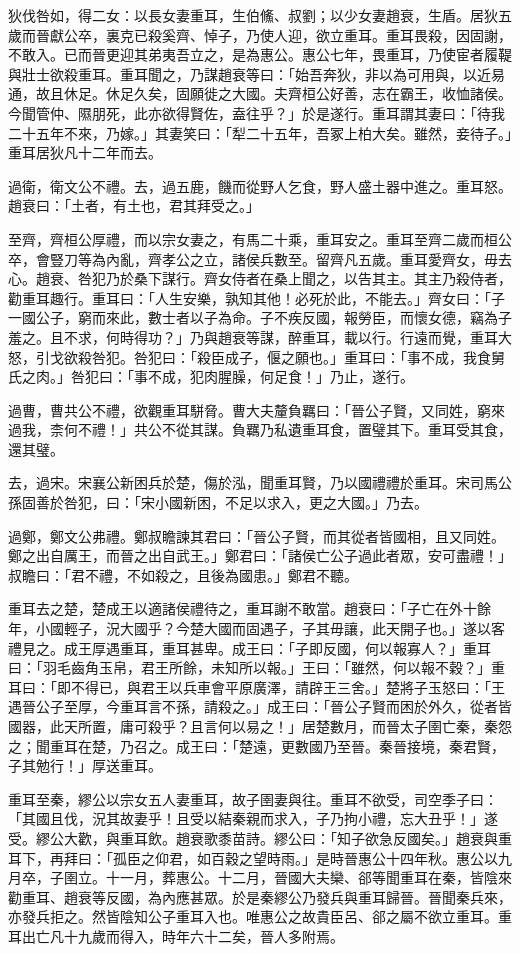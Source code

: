 \begin{pinyinscope}
狄伐咎如，得二女：以長女妻重耳，生伯鯈、叔劉；以少女妻趙衰，生盾。居狄五歲而晉獻公卒，裏克已殺奚齊、悼子，乃使人迎，欲立重耳。重耳畏殺，因固謝，不敢入。已而晉更迎其弟夷吾立之，是為惠公。惠公七年，畏重耳，乃使宦者履鞮與壯士欲殺重耳。重耳聞之，乃謀趙衰等曰：「始吾奔狄，非以為可用與，以近易通，故且休足。休足久矣，固願徙之大國。夫齊桓公好善，志在霸王，收恤諸侯。今聞管仲、隰朋死，此亦欲得賢佐，盍往乎？」於是遂行。重耳謂其妻曰：「待我二十五年不來，乃嫁。」其妻笑曰：「犁二十五年，吾冢上柏大矣。雖然，妾待子。」重耳居狄凡十二年而去。

過衛，衛文公不禮。去，過五鹿，饑而從野人乞食，野人盛土器中進之。重耳怒。趙衰曰：「土者，有土也，君其拜受之。」

至齊，齊桓公厚禮，而以宗女妻之，有馬二十乘，重耳安之。重耳至齊二歲而桓公卒，會豎刀等為內亂，齊孝公之立，諸侯兵數至。留齊凡五歲。重耳愛齊女，毋去心。趙衰、咎犯乃於桑下謀行。齊女侍者在桑上聞之，以告其主。其主乃殺侍者，勸重耳趣行。重耳曰：「人生安樂，孰知其他！必死於此，不能去。」齊女曰：「子一國公子，窮而來此，數士者以子為命。子不疾反國，報勞臣，而懷女德，竊為子羞之。且不求，何時得功？」乃與趙衰等謀，醉重耳，載以行。行遠而覺，重耳大怒，引戈欲殺咎犯。咎犯曰：「殺臣成子，偃之願也。」重耳曰：「事不成，我食舅氏之肉。」咎犯曰：「事不成，犯肉腥臊，何足食！」乃止，遂行。

過曹，曹共公不禮，欲觀重耳駢脅。曹大夫釐負羈曰：「晉公子賢，又同姓，窮來過我，柰何不禮！」共公不從其謀。負羈乃私遺重耳食，置璧其下。重耳受其食，還其璧。

去，過宋。宋襄公新困兵於楚，傷於泓，聞重耳賢，乃以國禮禮於重耳。宋司馬公孫固善於咎犯，曰：「宋小國新困，不足以求入，更之大國。」乃去。

過鄭，鄭文公弗禮。鄭叔瞻諫其君曰：「晉公子賢，而其從者皆國相，且又同姓。鄭之出自厲王，而晉之出自武王。」鄭君曰：「諸侯亡公子過此者眾，安可盡禮！」叔瞻曰：「君不禮，不如殺之，且後為國患。」鄭君不聽。

重耳去之楚，楚成王以適諸侯禮待之，重耳謝不敢當。趙衰曰：「子亡在外十餘年，小國輕子，況大國乎？今楚大國而固遇子，子其毋讓，此天開子也。」遂以客禮見之。成王厚遇重耳，重耳甚卑。成王曰：「子即反國，何以報寡人？」重耳曰：「羽毛齒角玉帛，君王所餘，未知所以報。」王曰：「雖然，何以報不穀？」重耳曰：「即不得已，與君王以兵車會平原廣澤，請辟王三舍。」楚將子玉怒曰：「王遇晉公子至厚，今重耳言不孫，請殺之。」成王曰：「晉公子賢而困於外久，從者皆國器，此天所置，庸可殺乎？且言何以易之！」居楚數月，而晉太子圉亡秦，秦怨之；聞重耳在楚，乃召之。成王曰：「楚遠，更數國乃至晉。秦晉接境，秦君賢，子其勉行！」厚送重耳。

重耳至秦，繆公以宗女五人妻重耳，故子圉妻與往。重耳不欲受，司空季子曰：「其國且伐，況其故妻乎！且受以結秦親而求入，子乃拘小禮，忘大丑乎！」遂受。繆公大歡，與重耳飲。趙衰歌黍苗詩。繆公曰：「知子欲急反國矣。」趙衰與重耳下，再拜曰：「孤臣之仰君，如百穀之望時雨。」是時晉惠公十四年秋。惠公以九月卒，子圉立。十一月，葬惠公。十二月，晉國大夫欒、郤等聞重耳在秦，皆陰來勸重耳、趙衰等反國，為內應甚眾。於是秦繆公乃發兵與重耳歸晉。晉聞秦兵來，亦發兵拒之。然皆陰知公子重耳入也。唯惠公之故貴臣呂、郤之屬不欲立重耳。重耳出亡凡十九歲而得入，時年六十二矣，晉人多附焉。


\end{pinyinscope}
